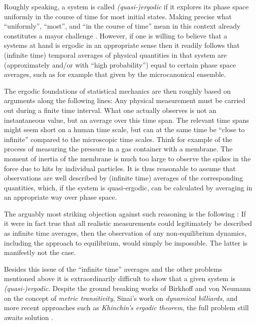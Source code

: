 \documentclass[a4paper,12pt,listof=totoc,index=totoc,bibliography=totoc,headsepline=false,headings=normal,BCOR16.153846mm,DIV12,headinclude,twoside,cleardoublepage=empty,numbers=noenddot,final]{scrreprt}
\theoremstyle{mystyle}
\numberwithin{equation}{section}
\numberwithin{figure}{section}
\numberwithin{lemma}{section}
\numberwithin{theorem}{section}
\numberwithin{corollary}{section}
\numberwithin{definition}{section}
\numberwithin{conjecture}{section}
\numberwithin{observation}{section}
\newcommand{\+}{\mkern2mu}
\DeclareMathOperator{\1}{\mathds{1}}
\begin{document}
Roughly speaking, a system is called \emph{(quasi-)ergodic} if it explores its phase space uniformly in the course of time for most initial states.
Making precise what ``uniformly'', ``most'', and ``in the course of time'' mean in this context already constitutes a mayor challenge \cite{UffinkFinal}.
However, if one is willing to believe that a systems at hand is ergodic in an appropriate sense then it readily follows that (infinite time) temporal averages of physical quantities in that system are (approximately and/or with ``high probability'') equal to certain phase space averages, such as for example that given by the microcanonical ensemble. 

The ergodic foundations of statistical mechanics are then roughly based on arguments along the following lines:
Any physical measurement must be carried out during a finite time interval.
What one actually observes is not an instantaneous value, but an average over this time span.
The relevant time spans might seem short on a human time scale, but can at the same time be ``close to infinite'' compared to the microscopic time scales.
Think for example of the process of measuring the pressure in a gas container with a membrane.
The moment of inertia of the membrane is much too large to observe the spikes in the force due to hits by individual particles.
It is thus reasonable to assume that observations are well described by (infinite time) averages of the corresponding quantities, which, if the system is quasi-ergodic, can be calculated by averaging in an appropriate way over phase space.

The arguably most striking objection against such reasoning is the following \cite{Sklar1995}:
If it were in fact true that all realistic measurements could legitimately be described as infinite time averages, then the observation of any non-equilibrium dynamics, including the approach to equilibrium, would simply be impossible.
The latter is manifestly not the case.

Besides this issue of the ``infinite time'' averages and the other problems mentioned above it is extraordinarily difficult to show that a given system is \emph{(quasi-)ergodic}.
Despite the ground breaking works of Birkhoff and von Neumann on the concept of \emph{metric transitivity}, Sinai's work on \emph{dynamical billiards}, and more recent approaches such as \emph{Khinchin's ergodic theorem}, the full problem still awaits solution \cite{UffinkFinal}.
\end{document}
